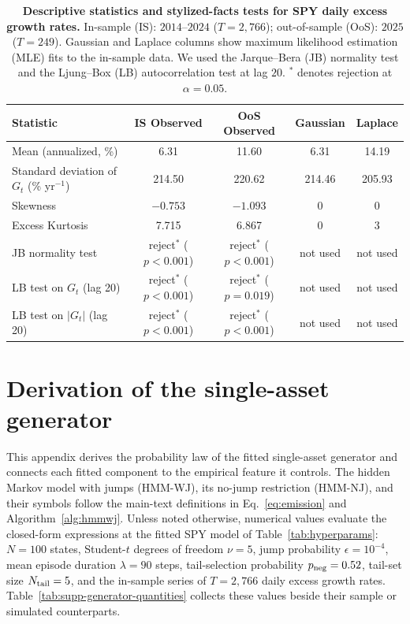 \begin{table}[H]
\centering
\caption{\textbf{Descriptive statistics and stylized-facts tests for
    SPY daily excess growth rates.} In-sample (IS): $2014$--$2024$
    ($T = 2{,}766$); out-of-sample (OoS): $2025$ ($T = 249$).
    Gaussian and Laplace columns show maximum likelihood estimation
    (MLE) fits to the in-sample data. We used the Jarque--Bera (JB)
    normality test and the Ljung--Box (LB) autocorrelation test at lag
    $20$. $^{\ast}$ denotes rejection at
    $\alpha = 0.05$.}
\label{tab:descriptive_stats}
\small
\begin{tabular}{@{}lcccc@{}}
\toprule
\textbf{Statistic} & \textbf{IS Observed} & \textbf{OoS Observed} & \textbf{Gaussian} & \textbf{Laplace} \\ \midrule
Mean (annualized, \%)       & 6.31   & 11.60  & 6.31   & 14.19  \\
Standard deviation of $G_t$ (\% yr$^{-1}$) & 214.50 & 220.62 & 214.46 & 205.93 \\
Skewness                    & $-0.753$ & $-1.093$ & 0    & 0      \\
Excess Kurtosis             & 7.715  & 6.867  & 0      & 3      \\
JB normality test           & reject$^\ast$ ($p<0.001$) & reject$^\ast$ ($p<0.001$) & not used & not used \\
LB test on $G_t$ (lag 20)   & reject$^\ast$ ($p<0.001$) & reject$^\ast$ ($p=0.019$) & not used & not used \\
LB test on $|G_t|$ (lag 20) & reject$^\ast$ ($p<0.001$) & reject$^\ast$ ($p<0.001$) & not used & not used \\
\bottomrule
\end{tabular}
\end{table}

\section{Derivation of the single-asset generator}
\label{sec:supp-generator}

This appendix derives the probability law of the fitted single-asset
generator and connects each fitted component to the empirical feature
it controls. The hidden Markov model with jumps (HMM-WJ), its no-jump
restriction (HMM-NJ), and their symbols follow the main-text
definitions in Eq.~\eqref{eq:emission} and
Algorithm~\ref{alg:hmmwj}. Unless noted otherwise, numerical values
evaluate the closed-form expressions at the fitted SPY model of
Table~\ref{tab:hyperparams}: $N = 100$ states, Student-$t$ degrees of
freedom $\nu = 5$, jump probability $\epsilon = 10^{-4}$, mean episode
duration $\lambda = 90$ steps, tail-selection probability
$p_{\rm neg} = 0.52$, tail-set size $N_{\rm tail} = 5$, and the
in-sample series of $T = 2{,}766$ daily excess growth rates.
Table~\ref{tab:supp-generator-quantities} collects these values
beside their sample or simulated counterparts.

